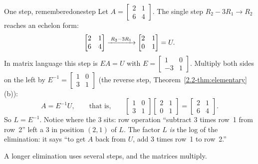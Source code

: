 \documentclass[11pt]{article}
\begin{document}
\begin{exmp}{One step, remembered}{onestep}
Let $A=\begin{bmatrix}2&1\\6&4\end{bmatrix}$. The single step $R_2-3R_1\to R_2$ reaches an echelon form:
\[
\begin{bmatrix}2&1\\6&4\end{bmatrix}\xrightarrow{\;R_2-3R_1\;}\begin{bmatrix}2&1\\0&1\end{bmatrix}=U .
\]
In matrix language this step is $EA=U$ with $E=\begin{bmatrix}1&0\\-3&1\end{bmatrix}$. Multiply both sides on the left by $E^{-1}=\begin{bmatrix}1&0\\3&1\end{bmatrix}$ (the reverse step, Theorem~\ref{2.2-thm:elementary}(b)):
\[
A=E^{-1}U,\qquad\text{that is,}\qquad
\begin{bmatrix}1&0\\3&1\end{bmatrix}\begin{bmatrix}2&1\\0&1\end{bmatrix}=\begin{bmatrix}2&1\\6&4\end{bmatrix}.
\]
So $L=E^{-1}$. Notice where the $3$ sits: row operation ``subtract $3$ times row~1 from row~2'' left a $3$ in position $(2,1)$ of $L$. The factor $L$ \emph{is} the log of the elimination: it says ``to get $A$ back from $U$, add $3$ times row~1 to row~2.''
\end{exmp}

A longer elimination uses several steps, and the matrices multiply.
\end{document}
